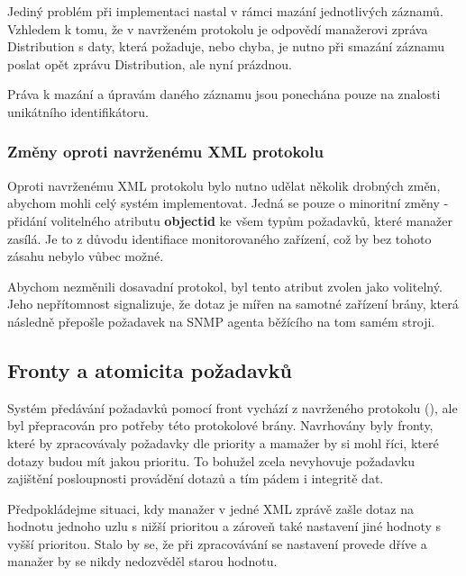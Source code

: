 Jediný problém při implementaci nastal v rámci mazání jednotlivých záznamů. Vzhledem k tomu, že v navrženém protokolu je odpovědí
manažerovi zpráva Distribution s daty, která požaduje, nebo chyba, je nutno při smazání záznamu poslat opět zprávu Distribution, ale nyní
prázdnou.

Práva k mazání a úpravám daného záznamu jsou ponechána pouze na znalosti unikátního identifikátoru. 


\subsubsection*{Změny oproti navrženému XML protokolu}
Oproti navrženému XML protokolu bylo nutno udělat několik drobných změn, abychom mohli celý systém implementovat. Jedná se pouze o
minoritní změny - přidání volitelného atributu \textbf{objectid} ke všem typům požadavků, které manažer zasílá. Je to z důvodu
identifiace monitorovaného zařízení, což by bez tohoto zásahu nebylo vůbec možné.

Abychom nezměnili dosavadní protokol, byl tento atribut zvolen jako volitelný. Jeho nepřítomnost signalizuje, že dotaz je mířen
na samotné zařízení brány, která následně přepošle požadavek na SNMP agenta běžícího na tom samém stroji.


\subsection{Fronty a atomicita požadavků}
\label{kap_impl_fronta_atomicita}
Systém předávání požadavků pomocí front vychází z navrženého protokolu (\cite{macejko_dipl}), ale byl přepracován pro potřeby
této protokolové brány. Navrhovány byly fronty, které by zpracovávaly požadavky dle priority a mamažer by si mohl říci, které
dotazy budou mít jakou prioritu. To bohužel zcela nevyhovuje požadavku zajištění posloupnosti provádění dotazů a tím pádem i 
integritě dat.

Předpokládejme situaci, kdy manažer v jedné XML zprávě zašle dotaz na hodnotu jednoho uzlu s nižší prioritou a zároveň také nastavení
jiné hodnoty s vyšší prioritou. Stalo by se, že při zpracovávání se nastavení provede dříve a manažer by se nikdy nedozvěděl starou hodnotu.

